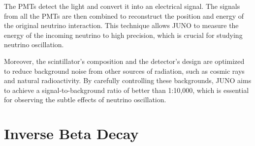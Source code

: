 The PMTs detect the light and convert it into an electrical signal. The signals from all the PMTs are then combined to reconstruct the position and energy of the original neutrino interaction. This technique allows JUNO to measure the energy of the incoming neutrino to high precision, which is crucial for studying neutrino oscillation.

Moreover, the scintillator's composition and the detector's design are optimized to reduce background noise from other sources of radiation, such as cosmic rays and natural radioactivity. By carefully controlling these backgrounds, JUNO aims to achieve a signal-to-background ratio of better than 1:10,000, which is essential for observing the subtle effects of neutrino oscillation.

\section{Inverse Beta Decay}